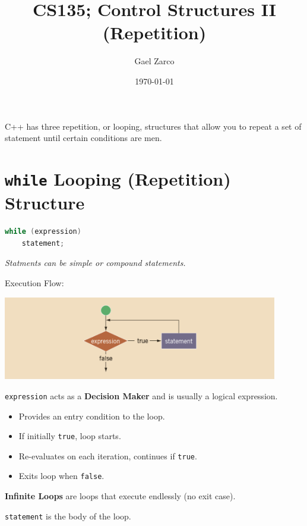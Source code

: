 \documentclass{article}
\title{CS135; Control Structures II (Repetition)}
\author{Gael Zarco}
\date{\today}
\begin{document}
\maketitle

C++ has three repetition, or looping, structures that allow you to repeat a set of statement until certain conditions are men.

\section{\texttt{while} Looping (Repetition) Structure}

\begin{lstlisting}[language=C++, caption={\texttt{while} Loop Syntax}]
while (expression)
	statement;
\end{lstlisting}
\textit{Statments can be simple or compound statements.}

\vspace{8pt}
Execution Flow:
\begin{center}
    \includegraphics[width=0.9\textwidth]{while-exec-flow.png}
\end{center}

\vspace{8pt}
\texttt{expression} acts as a \textbf{Decision Maker} and is usually a logical expression.
\begin{itemize}
    \item Provides an entry condition to the loop.
    \item If initially \texttt{true}, loop starts.
    \item Re-evaluates on each iteration, continues if \texttt{true}.
    \item Exits loop when \texttt{false}.
\end{itemize}

\textbf{Infinite Loops} are loops that execute endlessly (no exit case).

\vspace{8pt}
\texttt{statement} is the body of the loop.
\end{document}
